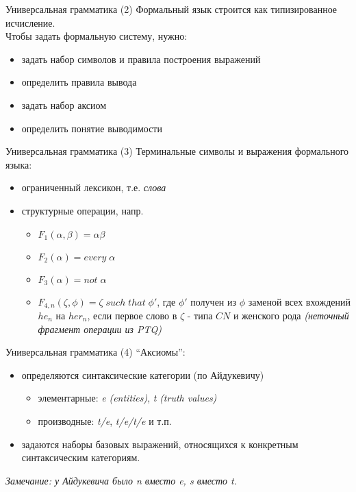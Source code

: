 \documentclass{beamer}
\begin{document}
\begin{frame}{Универсальная грамматика (2)}
Формальный язык строится как типизированное исчисление.\\
\bigskip
\bigskip
Чтобы задать формальную систему, нужно:\\
\begin{itemize}
  \item задать набор символов и правила построения выражений
  \item определить правила вывода
  \item задать набор аксиом
  \item определить понятие выводимости
\end{itemize}
\end{frame}

\begin{frame}{Универсальная грамматика (3)}
Терминальные символы и выражения формального языка:\\
\begin{itemize}
  \item ограниченный лексикон, т.е. \textit{слова}
  \item структурные операции, напр. 
    \begin{itemize}
      \item $F_1(\alpha, \beta) = \alpha \beta$
      \item $F_2(\alpha) = every \; \alpha$
      \item $F_3(\alpha) = not \; \alpha$
      \item $F_{4,n}(\zeta, \phi) = \zeta \; such \; that \; \phi'$, где $\phi'$ получен из $\phi$ заменой всех вхождений $he_n$ на $her_n$, если первое слово в $\zeta$ - типа $CN$ и женского рода \textit{(неточный фрагмент операции из PTQ)}
    \end{itemize}
\end{itemize}
\end{frame}

\begin{frame}{Универсальная грамматика (4)}
``Аксиомы'':\\
\begin{itemize}
  \item определяются синтаксические категории (по Айдукевичу)
    \begin{itemize}
      \item элементарные: \textit{e} \textit{(entities)}, \textit{t} \textit{(truth values)}
      \item производные: \textit{t/e}, \textit{t/e/t/e} и т.п.
    \end{itemize}
  \item задаются наборы базовых выражений, относящихся к конкретным синтаксическим категориям.
\end{itemize}
\bigskip
\textit{Замечание: у Айдукевича было n вместо e, s вместо t.}
\end{frame}
\end{document}
